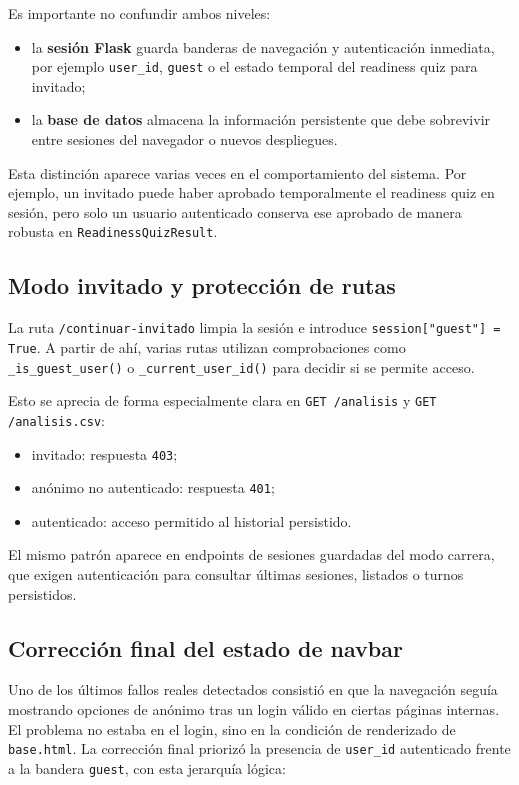 Es importante no confundir ambos niveles:

\begin{itemize}
    \item la \textbf{sesión Flask} guarda banderas de navegación y autenticación inmediata, por ejemplo \texttt{user\_id}, \texttt{guest} o el estado temporal del readiness quiz para invitado;
    \item la \textbf{base de datos} almacena la información persistente que debe sobrevivir entre sesiones del navegador o nuevos despliegues.
\end{itemize}

Esta distinción aparece varias veces en el comportamiento del sistema. Por ejemplo, un invitado puede haber aprobado temporalmente el readiness quiz en sesión, pero solo un usuario autenticado conserva ese aprobado de manera robusta en \texttt{ReadinessQuizResult}.

\subsection{Modo invitado y protección de rutas}

La ruta \texttt{/continuar-invitado} limpia la sesión e introduce \texttt{session["guest"] = True}. A partir de ahí, varias rutas utilizan comprobaciones como \texttt{\_is\_guest\_user()} o \texttt{\_current\_user\_id()} para decidir si se permite acceso.

Esto se aprecia de forma especialmente clara en \texttt{GET /analisis} y \texttt{GET /analisis.csv}:

\begin{itemize}
    \item invitado: respuesta \texttt{403};
    \item anónimo no autenticado: respuesta \texttt{401};
    \item autenticado: acceso permitido al historial persistido.
\end{itemize}

El mismo patrón aparece en endpoints de sesiones guardadas del modo carrera, que exigen autenticación para consultar últimas sesiones, listados o turnos persistidos.

\subsection{Corrección final del estado de navbar}

Uno de los últimos fallos reales detectados consistió en que la navegación seguía mostrando opciones de anónimo tras un login válido en ciertas páginas internas. El problema no estaba en el login, sino en la condición de renderizado de \texttt{base.html}. La corrección final priorizó la presencia de \texttt{user\_id} autenticado frente a la bandera \texttt{guest}, con esta jerarquía lógica:

